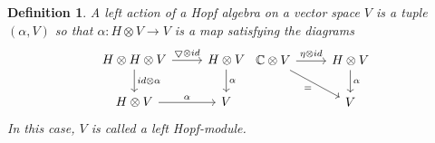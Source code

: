 \documentclass[12pt,a4paper]{article}
\newtheorem{definition}[theorem]{Definition}
\newcommand\1{_{(1)}}
\newcommand\2{_{(2)}}
\begin{document}
\begin{definition} A left action of a Hopf algebra on a vector space $V$ is a tuple $(\alpha, V)$ so that
$\alpha:H\otimes V\to V$ is a map satisfying the diagrams
\[
\begin{tikzcd}
H\otimes H\otimes V \arrow[r, "\bigtriangledown\otimes id"] \arrow[d, "id\otimes \alpha"] & H\otimes V \arrow[d, "\alpha"] \\
H\otimes V \arrow[r, "\alpha"]                                                         & V                             
\end{tikzcd}
\begin{tikzcd}
\mathbb{C}\otimes V \arrow[r, "\eta\otimes id"] \arrow[rd, "="'] & H\otimes V \arrow[d, "\alpha"] \\
                                                          & V                             
\end{tikzcd}
\]
In this case, $V$ is called a left Hopf-module.
\end{definition}
\end{document}
